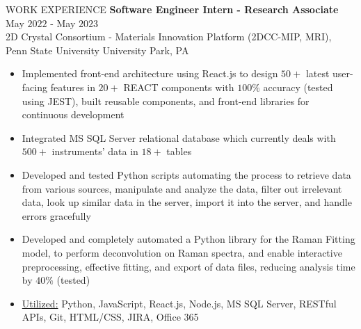 \documentclass{resume} %
\begin{document}
\begin{rSection}{WORK EXPERIENCE}
{\bf Software Engineer Intern - Research Associate} \hfill May $2022$ - May $2023$\\
2D Crystal Consortium - Materials Innovation Platform (2DCC-MIP, MRI), Penn State University \hfill University Park, PA
\begin{itemize}[itemsep = -4pt]
    \item Implemented front-end architecture using React.js to design $50+$ latest user-facing features in $20+$ REACT components with $100\%$ accuracy (tested using JEST), built reusable components, and front-end libraries for continuous development
    \item Integrated MS SQL Server relational database which currently deals with $500+$ instruments' data in $18+$ tables
    \item Developed and tested Python scripts automating the process to retrieve data from various sources, manipulate and analyze the data, filter out irrelevant data, look up similar data in the server, import it into the server, and handle errors gracefully
    \item Developed and completely automated a Python library for the Raman Fitting model, to perform deconvolution on Raman spectra, and enable interactive preprocessing, effective fitting, and export of data files, reducing analysis time by $40\%$ (tested)
    \item \underline{Utilized:} Python, JavaScript, React.js, Node.js, MS SQL Server, RESTful APIs, Git, HTML/CSS, JIRA, Office 365
\end{itemize}

\end{rSection} 


\end{document}
